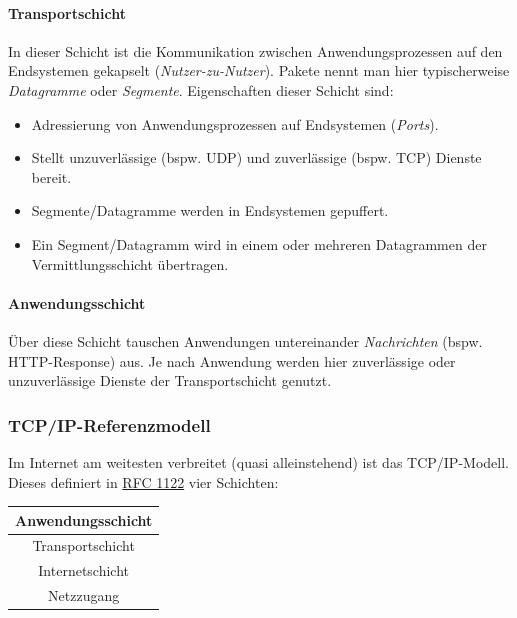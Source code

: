 \documentclass[a4paper, 14pt]{article}
\begin{document}
	\paragraph{Transportschicht}

	In dieser Schicht ist die Kommunikation zwischen Anwendungsprozessen auf den Endsystemen gekapselt (\emph{Nutzer-zu-Nutzer}).
	Pakete nennt man hier typischerweise \emph{Datagramme} oder \emph{Segmente}.
	Eigenschaften dieser Schicht sind:

	\begin{itemize}
		\item Adressierung von Anwendungsprozessen auf Endsystemen (\emph{Ports}).
		\item Stellt unzuverlässige (bspw. UDP) und zuverlässige (bspw. TCP) Dienste bereit.
		\item Segmente/Datagramme werden in Endsystemen gepuffert.
		\item Ein Segment/Datagramm wird in einem oder mehreren Datagrammen der Vermittlungsschicht übertragen.
	\end{itemize}

	\paragraph{Anwendungsschicht}

	Über diese Schicht tauschen Anwendungen untereinander \emph{Nachrichten} (bspw. HTTP-Response) aus.
	Je nach Anwendung werden hier zuverlässige oder unzuverlässige Dienste der Transportschicht genutzt.

	\subsubsection{TCP/IP-Referenzmodell}

	Im Internet am weitesten verbreitet (quasi alleinstehend) ist das TCP/IP-Modell.
	Dieses definiert in \href{https://tools.ietf.org/html/rfc1122}{RFC 1122} vier Schichten:

	\begin{center}
		\Large
		\begin{tabular}{| c |}
			\hline
			Anwendungsschicht \\
			\hline
			Transportschicht \\
			\hline
			Internetschicht \\
			\hline
			Netzzugang \\
			\hline
		\end{tabular}
	\end{center}
\end{document}
